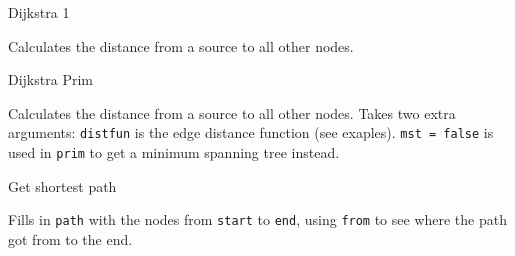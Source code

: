 \begin{algorithm}{Dijkstra 1}

Calculates the distance from a source to all other nodes.
\end{algorithm}

\begin{algorithm}{Dijkstra Prim}

Calculates the distance from a source to all other nodes.
Takes two extra arguments:
{\tt distfun} is the edge distance function (see exaples).
{\tt mst = false} is used in {\tt prim} to get a
minimum spanning tree instead.
\end{algorithm}

\begin{algorithm}{Get shortest path}

Fills in {\tt path} with the nodes from {\tt start} to {\tt end}, using
{\tt from} to see where the path got from to the end.
\end{algorithm}
